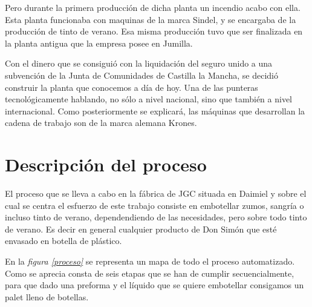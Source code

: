 \documentclass[11pt,a4paper,spanish,twoside]{report}
\begin{document}
Pero durante la primera producción de dicha planta un incendio acabo con
ella. Esta planta funcionaba con maquinas de la marca Sindel, y se encargaba
de la producción de tinto de verano. Esa misma producción tuvo que ser
finalizada en la planta antigua que la empresa posee en Jumilla.

Con el dinero que se consiguió con la liquidación del seguro unido a una
subvención de la Junta de Comunidades de Castilla la Mancha, se decidió
construir la planta que conocemos a día de hoy. Una de las punteras
tecnológicamente hablando, no sólo a nivel nacional, sino que también a nivel
internacional. Como posteriormente se explicará, las máquinas que desarrollan
la cadena de trabajo son de la marca alemana Krones.

\chapter{Descripción del proceso}
El proceso que se lleva a cabo en la fábrica de JGC situada en Daimiel y
sobre el cual se centra el esfuerzo de este trabajo consiste en embotellar
zumos, sangría o incluso tinto de verano, dependendiendo de las necesidades,
pero sobre todo tinto de verano. Es decir en general cualquier producto de
Don Simón que esté envasado en botella de plástico.

En la \emph{figura \ref{proceso}} se representa un mapa de todo el proceso
automatizado. Como se aprecia consta de seis etapas que se han de cumplir
secuencialmente, para que dado una preforma y el líquido que se quiere
embotellar consigamos un palet lleno de botellas.
\end{document}
